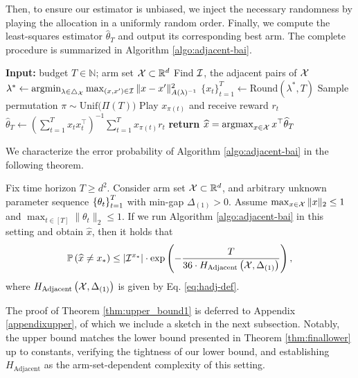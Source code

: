  Then, to ensure our estimator is unbiased, we inject the necessary randomness by playing the allocation in a uniformly random order. Finally, we compute the least-squares estimator $\widehat{\theta}_T$ and output its corresponding best arm. The complete procedure is summarized in Algorithm \ref{algo:adjacent-bai}.\begin{algorithm}[htbp]
    \caption{Adjacent--BAI}
    \label{algo:adjacent-bai}
    \begin{algorithmic}[1]
        \STATE \textbf{Input:} budget $T\in\mathbb{N}$; arm set $\mathcal{X}\subset\mathbb{R}^d$
        \STATE Find $\mathcal{I}$, the adjacent pairs of $\mathcal{X}$
        \STATE $\lambda^* \leftarrow \operatorname*{argmin}_{\lambda \in \triangle_{\mathcal{X}}} \max_{(x, x') \in \mathcal{I}}\|x-x'\|^2_{A(\lambda)^{-1}}$
        \STATE $\{x_{t}\}_{t=1}^{T} \leftarrow  \text{Round}(\lambda^*, T)$
        \STATE Sample permutation $\pi \sim \mathrm{Unif(}\Pi(T))$
            \STATE Play $x_{\pi(t)}$ and receive reward $r_t$
        \ENDFOR
        \STATE $\widehat{\theta}_T\leftarrow \left(\sum_{t=1}^Tx_{t}x_{t}^\top\right)^{-1}\sum_{t=1}^Tx_{\pi(t)} r_t$ 
        \STATE \textbf{return} $\widehat{x} =\operatorname*{argmax}_{x\in\mathcal{X}}x^\top\widehat{\theta}_T$
    \end{algorithmic}
\end{algorithm} We characterize the error probability of Algorithm \ref{algo:adjacent-bai} in the following theorem.
\begin{theorem}
    \label{thm:upper_bound1}
    Fix time horizon $T \geq d^2$. Consider arm set $\mathcal{X}\subset\mathbb{R}^d$, and arbitrary unknown parameter sequence $\left\{\theta_t\right\}_{t=1}^{T}$ with min-gap $\Delta_{(1)} > 0$. Assume $\max_{x\in \mathcal{X}}\|x\|_2 \leq 1$ and $\max_{t \in[T]} \|\theta_t\|_2 \leq 1$. If we run Algorithm \ref{algo:adjacent-bai} in this setting and obtain $\widehat{x}$, then it holds that
    \begin{equation} \mathbb{P}\left(\widehat{x}\neq x_*\right)\leq \left|\mathcal{I}^{x_*}\right| \cdot \exp\left(-\frac{T}{36 \cdot H_{\mathrm{Adjacent}}\left(\mathcal{X}, \Delta_{(1)}\right)}\right),\end{equation}where $ H_{\mathrm{Adjacent}}\left(\mathcal{X}, \Delta_{(1)}\right)$ is given by Eq. \eqref{eq:hadj-def}.
\end{theorem}
The proof of Theorem \ref{thm:upper_bound1} is deferred to Appendix \ref{appendixupper}, of which we include a sketch in the next subsection. 
Notably, the upper bound matches the lower bound presented in Theorem \ref{thm:finallower} up to constants, verifying the tightness of our lower bound, and establishing $H_{\mathrm{Adjacent}}$ as the arm-set-dependent complexity of this setting.

